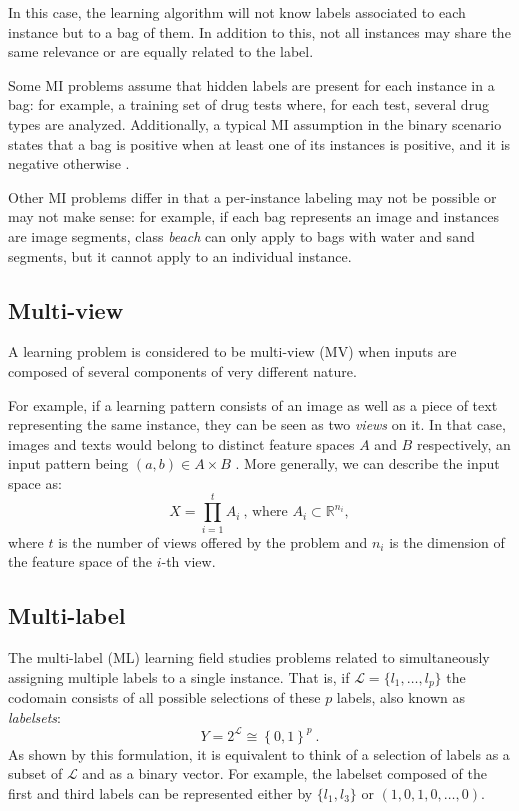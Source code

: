 In this case, the learning algorithm will not know labels associated to each instance but to a bag of them. In addition to this, not all instances may share the same relevance or are equally related to the label.

Some MI problems assume that hidden labels are present for each instance in a bag: for example, a training set of drug tests where, for each test, several drug types are analyzed. Additionally, a typical MI assumption in the binary scenario states that a bag is positive when at least one of its instances is positive, and it is negative otherwise .

Other MI problems differ in that a per-instance labeling may not be possible or may not make sense: for example, if each bag represents an image and instances are image segments, class \emph{beach} can only apply to bags with water and sand segments, but it cannot apply to an individual instance.


\subsection{Multi-view}
\label{p3sec:mview}

A learning problem is considered to be multi-view (MV)  when inputs are composed of several components of very different nature. 

For example, if a learning pattern consists of an image as well as a piece of text representing the same instance, they can be seen as two \emph{views} on it. In that case, images and texts would belong to distinct feature spaces $A$ and $B$ respectively, an input pattern being $(a,b)\in A\times B$ . More generally, we can describe the input space as:
\begin{equation}
  X=\prod_{i=1}^{t}A_{i}~\mbox{, where }A_i\subset\mathbb R^{n_i},
  \end{equation}
where $t$ is the number of views offered by the problem and $n_i$ is the dimension of the feature space of the $i$-th view.

\subsection{Multi-label}
\label{p3sec:mlabel}

The multi-label (ML) learning field  studies problems related to simultaneously assigning multiple labels to a single instance. That is, if $\mathcal L = \{l_1,\dots,l_p\}$ the codomain consists of all possible selections of these $p$ labels, also known as \emph{labelsets}:
\begin{equation}
  Y=2^{\mathcal L}\cong\left\{0,1\right\}^p~.
  \end{equation} 
As shown by this formulation, it is equivalent to think of a selection of labels as a subset of $\mathcal L$ and as a binary vector. For example, the labelset composed of the first and third labels can be represented either by $\{l_1,l_3\}$ or $(1,0,1,0,\dots,0)$.


